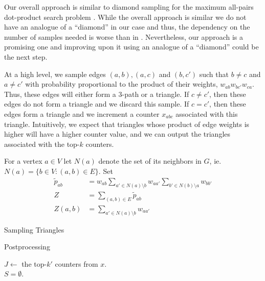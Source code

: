 \documentclass{article}
\begin{document}
Our overall approach is similar to diamond sampling 
for the maximum all-pairs dot-product search problem 
\cite{diamond}. While the overall approach is similar we
do not have an analogue of a ``diamond'' in our case and thus,
the dependency on the number of samples needed is worse than
in \cite{diamond}. Nevertheless, our approach is a promising
one and improving upon it using an analogue of a ``diamond''
could be the next step.

At a high level, we sample edges $(a,b), (a,c)$
and $(b,c')$ such that $b \neq c$ and $a \neq c'$
with probability proportional to the product of their weights,
$w_{ab}w_{bc'}w_{ca}$. Thus, these edges will either form a 3-path 
or a triangle.
If $c \neq c'$, then these edges do not
form a triangle and we discard this sample.
If $c=c'$, then these edges form a triangle and we increment a 
counter $x_{abc}$ associated with this triangle.
Intuitively, we expect that triangles whose product of edge weights
is higher will have a higher counter value, and we can output the
triangles associated with the top-$k$ counters.

For a vertex $a \in V$ let $N(a)$ denote the set of its neighbors
in $G$, ie. $N(a) = \{b \in V : (a,b) \in E\}$.
Set
\begin{align}
\tilde p_{ab} &= w_{ab} \sum\limits_{a' \in N(a) \setminus b}w_{aa'} \sum\limits_{b' \in N(b) \setminus a}w_{bb'} \label{eq:tildep}\\
Z &= \sum\limits_{(a,b) \in E}\tilde p_{ab} \label{eq:z}\\
Z(a,b) &= \sum\limits_{a' \in N(a) \setminus b}w_{aa'} \label{eq:zab}
\end{align}

\begin{algorithm}\label{alg:sampling}
  \caption{Sampling Triangles}
\end{algorithm}

\begin{algorithm}\label{alg:postprocess}
  \caption{Postprocessing}
  $J \leftarrow $ the top-$k'$ counters from $x$.\\
  $S = \emptyset$.\\
\end{algorithm}
\end{document}
